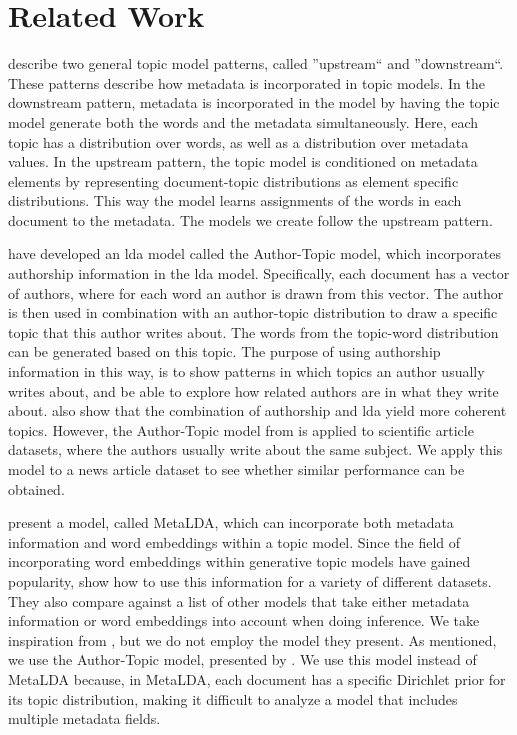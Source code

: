 \section{Related Work}\label{sec:related_work}
\citet{mimno2008topic} describe two general topic model patterns, called ''upstream`` and ''downstream``.
These patterns describe how metadata is incorporated in topic models.
In the downstream pattern, metadata is incorporated in the model by having the topic model generate both the words and the metadata simultaneously.
Here, each topic has a distribution over words, as well as a distribution over metadata values.
In the upstream pattern, the topic model is conditioned on metadata elements by representing document-topic distributions as element specific distributions.
This way the model learns assignments of the words in each document to the metadata.
The models we create follow the upstream pattern.

\citet{author_topic_2012} have developed an \gls{lda} model called the Author-Topic model, which incorporates authorship information in the \gls{lda} model.
Specifically, each document has a vector of authors, where for each word an author is drawn from this vector.
The author is then used in combination with an author-topic distribution to draw a specific topic that this author writes about.
The words from the topic-word distribution can be generated based on this topic.
The purpose of using authorship information in this way, is to show patterns in which topics an author usually writes about, and be able to explore how related authors are in what they write about.
\citeauthor{author_topic_2012} also show that the combination of authorship and \gls{lda} yield more coherent topics.
However, the Author-Topic model from \citet{author_topic_2012} is applied to scientific article datasets, where the authors usually write about the same subject.
We apply this model to a news article dataset to see whether similar performance can be obtained.

\citet{MetaLDA2017} present a model, called MetaLDA, which can incorporate both metadata information and word embeddings within a topic model.
Since the field of incorporating word embeddings within generative topic models have gained popularity\cite{dieng2020topic}, \citet{MetaLDA2017} show how to use this information for a variety of different datasets.
They also compare against a list of other models that take either metadata information or word embeddings into account when doing inference.
We take inspiration from \citet{MetaLDA2017}, but we do not employ the model they present.
As mentioned, we use the Author-Topic model, presented by \citet{author_topic_2012}. 
We use this model instead of MetaLDA because, in MetaLDA, each document has a specific Dirichlet prior for its topic distribution, making it difficult to analyze a model that includes multiple metadata fields.

